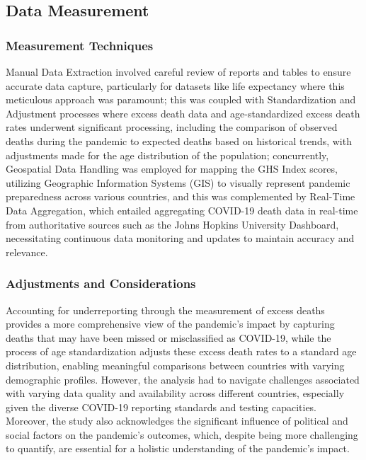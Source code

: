 \documentclass[
  letterpaper,
  DIV=11,
  numbers=noendperiod]{scrartcl}
\begin{document}
\hypertarget{data-measurement}{%
\subsection{Data Measurement}\label{data-measurement}}

\hypertarget{measurement-techniques}{%
\subsubsection{Measurement Techniques}\label{measurement-techniques}}

Manual Data Extraction involved careful review of reports and tables to
ensure accurate data capture, particularly for datasets like life
expectancy where this meticulous approach was paramount; this was
coupled with Standardization and Adjustment processes where excess death
data and age-standardized excess death rates underwent significant
processing, including the comparison of observed deaths during the
pandemic to expected deaths based on historical trends, with adjustments
made for the age distribution of the population; concurrently,
Geospatial Data Handling was employed for mapping the GHS Index scores,
utilizing Geographic Information Systems (GIS) to visually represent
pandemic preparedness across various countries, and this was
complemented by Real-Time Data Aggregation, which entailed aggregating
COVID-19 death data in real-time from authoritative sources such as the
Johns Hopkins University Dashboard, necessitating continuous data
monitoring and updates to maintain accuracy and relevance.

\hypertarget{adjustments-and-considerations}{%
\subsubsection{Adjustments and
Considerations}\label{adjustments-and-considerations}}

Accounting for underreporting through the measurement of excess deaths
provides a more comprehensive view of the pandemic's impact by capturing
deaths that may have been missed or misclassified as COVID-19, while the
process of age standardization adjusts these excess death rates to a
standard age distribution, enabling meaningful comparisons between
countries with varying demographic profiles. However, the analysis had
to navigate challenges associated with varying data quality and
availability across different countries, especially given the diverse
COVID-19 reporting standards and testing capacities. Moreover, the study
also acknowledges the significant influence of political and social
factors on the pandemic's outcomes, which, despite being more
challenging to quantify, are essential for a holistic understanding of
the pandemic's impact.
\end{document}
